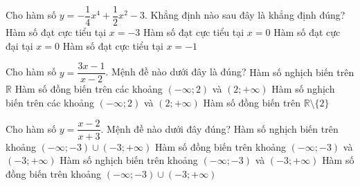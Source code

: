 \begin{ex}%
	Cho hàm số $ y = - \dfrac{1}{4}x^4 + \dfrac{1}{2}x^2 - 3 $. Khẳng định nào sau đây là khẳng định đúng?
	\choice
	{Hàm số đạt cực tiểu tại $ x = -3 $}
	{ \True Hàm số đạt cực tiểu tại $ x = 0 $}
	{Hàm số đạt cực đại tại $ x = 0 $}
	{Hàm số đạt cực tiểu tại $ x = -1 $}
\end{ex}

\begin{ex}
	Cho hàm số $y=\dfrac{3x-1}{x-2}$. Mệnh đề nào dưới đây là đúng?
	\choice
	{Hàm số nghịch biến trên $\mathbb{R}$}
	{Hàm số đồng biến trên các khoảng $(-\infty;2)$ và $(2;+\infty)$}
	{\True Hàm số nghịch biến trên các khoảng $(-\infty;2)$ và $(2;+\infty)$}
	{Hàm số đồng biến trên $\mathbb{R}\setminus\{2\}$}

\end{ex}

\begin{ex}
	Cho hàm số $y=\dfrac{x-2}{x+3}$. Mệnh đề nào dưới đây đúng?
	\choice
	{Hàm số nghịch biến trên khoảng $(-\infty;-3)\cup (-3;+\infty) $}
	{\True Hàm số đồng biến trên khoảng $(-\infty;-3) $ và $(-3;+\infty)$}
	{Hàm số nghịch biến trên khoảng $(-\infty;-3)$ và $(-3;+\infty)$}
	{Hàm số đồng biến trên khoảng $(-\infty;-3)\cup (-3;+\infty) $}
\end{ex}

